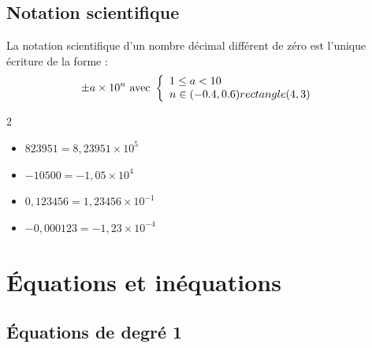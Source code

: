 \subsection{Notation scientifique}

\begin{Définition}
La notation scientifique d'un nombre décimal différent de zéro est l'unique écriture de la forme : 
$$\pm a\times 10^n \text{ avec } \left\{
    \begin{array}{ll}
       1\leq a <  10  & \\
      n\in (-0.4,0.6) rectangle (4,3)  & 
    \end{array}
\right.
$$
\end{Définition}

\begin{Exemples}
\leavevmode\vspace{-\baselineskip}
\vspace{-0.7cm}
\begin{multicols}{2}
\begin{itemize}[label=\textcolor{Couleur10}{$\bullet$}]
\item $823 951=8,239 51\times 10^{5}$
\item $-10 500=-1,05\times 10^{4}$
\item $0, 123 456=1,234 56\times 10^{-1}$
\item $-0,000 123=-1,23\times 10^{-4}$
\end{itemize}
\end{multicols}
\end{Exemples}



\section{Équations et inéquations}

\subsection{Équations de degré 1}

